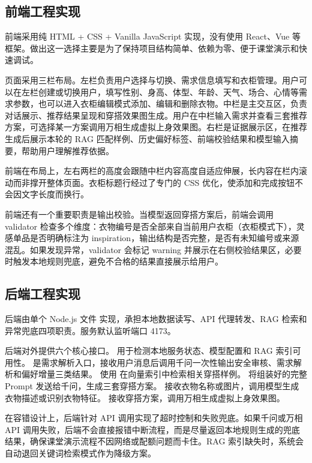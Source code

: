 \documentclass{applemlr}
\begin{document}
\subsection{前端工程实现}

前端采用纯 HTML + CSS + Vanilla JavaScript 实现，没有使用 React、Vue 等框架。做出这一选择主要是为了保持项目结构简单、依赖为零、便于课堂演示和快速调试。

页面采用三栏布局。左栏负责用户选择与切换、需求信息填写和衣柜管理。用户可以在左栏创建或切换用户，填写性别、身高、体型、年龄、天气、场合、心情等需求参数，也可以进入衣柜编辑模式添加、编辑和删除衣物。中栏是主交互区，负责对话展示、推荐结果呈现和穿搭效果图生成。用户在中栏输入需求并查看三套推荐方案，可选择某一方案调用万相生成虚拟上身效果图。右栏是证据展示区，在推荐生成后展示本轮的 RAG 匹配样例、历史偏好标签、前端校验结果和模型输入摘要，帮助用户理解推荐依据。

前端在布局上，左右两栏的高度会跟随中栏内容高度自适应伸展，长内容在栏内滚动而非撑开整体页面。衣柜标题行经过了专门的 CSS 优化，使添加和完成按钮不会因文字长度而换行。

前端还有一个重要职责是输出校验。当模型返回穿搭方案后，前端会调用 validator 检查多个维度：衣物编号是否全部来自当前用户衣柜（衣柜模式下），灵感单品是否明确标注为 inspiration，输出结构是否完整，是否有未知编号或来源混乱。如果发现异常，validator 会标记 warning 并展示在右侧校验结果区，必要时触发本地规则兜底，避免不合格的结果直接展示给用户。

\subsection{后端工程实现}

后端由单个 Node.js 文件  实现，承担本地数据读写、API 代理转发、RAG 检索和异常兜底四项职责。服务默认监听端口 4173。

后端对外提供六个核心接口。 用于检测本地服务状态、模型配置和 RAG 索引可用性。 是需求解析入口，接收用户消息后调用千问一次性输出安全审核、需求解析和偏好增量三类结果。 使用  在向量索引中检索相关穿搭样例。 将组装好的完整 Prompt 发送给千问，生成三套穿搭方案。 接收衣物名称或图片，调用模型生成衣物描述或识别衣物特征。 接收穿搭方案，调用万相生成虚拟上身效果图。

在容错设计上，后端针对 API 调用实现了超时控制和失败兜底。如果千问或万相 API 调用失败，后端不会直接报错中断流程，而是尽量返回本地规则生成的兜底结果，确保课堂演示流程不因网络或配额问题而卡住。RAG 索引缺失时，系统会自动退回关键词检索模式作为降级方案。
\end{document}
